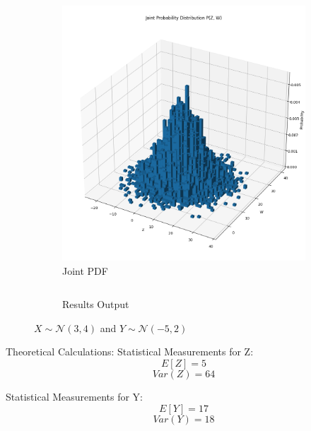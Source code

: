 \documentclass{article}
\begin{document}
\begin{figure}[H]
\begin{subfigure}{0.45\textwidth}
    \centering \includegraphics[width=\linewidth]{results/section3/b(2).png}
    \caption{Joint PDF}
  \end{subfigure}
  \begin{subfigure}{\textwidth}
    \inputminted{text}{results/section3/b.txt}
    \caption{Results Output}
  \end{subfigure}
  \caption{$X \sim \mathcal{N}(3, 4)$ and $Y \sim \mathcal{N}(-5,2)$}
\end{figure}
Theoretical Calculations:
Statistical Measurements for Z:
$$E[Z] = 5$$
$$Var(Z) = 64$$

Statistical Measurements for Y:
$$E[Y] = 17$$
$$Var(Y) = 18$$
\newpage
\end{document}

